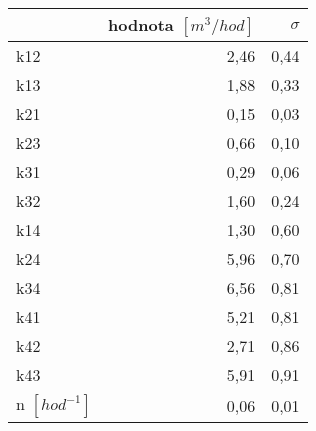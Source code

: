 \begin{tabular}{lrr}
\toprule
{} &  hodnota $\left[\si{m^3/hod}\right]$ &  $\sigma$ \\
\midrule
k12                 &                                 2,46 &      0,44 \\
k13                 &                                 1,88 &      0,33 \\
k21                 &                                 0,15 &      0,03 \\
k23                 &                                 0,66 &      0,10 \\
k31                 &                                 0,29 &      0,06 \\
k32                 &                                 1,60 &      0,24 \\
k14                 &                                 1,30 &      0,60 \\
k24                 &                                 5,96 &      0,70 \\
k34                 &                                 6,56 &      0,81 \\
k41                 &                                 5,21 &      0,81 \\
k42                 &                                 2,71 &      0,86 \\
k43                 &                                 5,91 &      0,91 \\
n $[\si{hod^{-1}}]$ &                                 0,06 &      0,01 \\
\bottomrule
\end{tabular}
